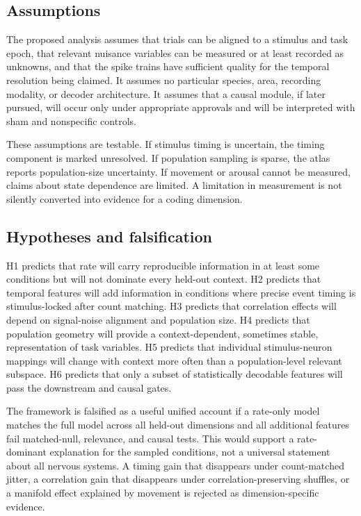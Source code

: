 \documentclass[conference]{IEEEtran}
\begin{document}
\subsection{Assumptions}
The proposed analysis assumes that trials can be aligned to a stimulus and task epoch, that relevant nuisance variables can be measured or at least recorded as unknowns, and that the spike trains have sufficient quality for the temporal resolution being claimed. It assumes no particular species, area, recording modality, or decoder architecture. It assumes that a causal module, if later pursued, will occur only under appropriate approvals and will be interpreted with sham and nonspecific controls.

These assumptions are testable. If stimulus timing is uncertain, the timing component is marked unresolved. If population sampling is sparse, the atlas reports population-size uncertainty. If movement or arousal cannot be measured, claims about state dependence are limited. A limitation in measurement is not silently converted into evidence for a coding dimension.

\subsection{Hypotheses and falsification}
H1 predicts that rate will carry reproducible information in at least some conditions but will not dominate every held-out context. H2 predicts that temporal features will add information in conditions where precise event timing is stimulus-locked after count matching. H3 predicts that correlation effects will depend on signal-noise alignment and population size. H4 predicts that population geometry will provide a context-dependent, sometimes stable, representation of task variables. H5 predicts that individual stimulus-neuron mappings will change with context more often than a population-level relevant subspace. H6 predicts that only a subset of statistically decodable features will pass the downstream and causal gates.

The framework is falsified as a useful unified account if a rate-only model matches the full model across all held-out dimensions and all additional features fail matched-null, relevance, and causal tests. This would support a rate-dominant explanation for the sampled conditions, not a universal statement about all nervous systems. A timing gain that disappears under count-matched jitter, a correlation gain that disappears under correlation-preserving shuffles, or a manifold effect explained by movement is rejected as dimension-specific evidence.
\end{document}
